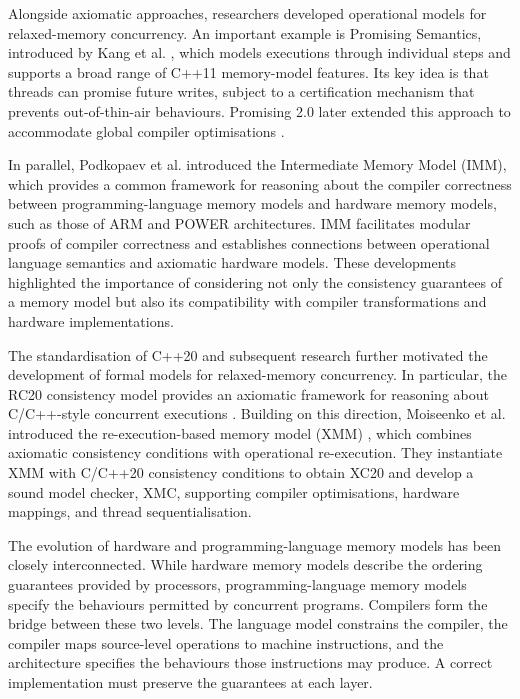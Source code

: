 Alongside axiomatic approaches, researchers developed operational models for relaxed-memory concurrency. An important example is Promising Semantics, introduced by Kang et al. \cite{Kang2017}, which models executions through individual steps and supports a broad range of C++11 memory-model features. Its key idea is that threads can promise future writes, subject to a certification mechanism that prevents out-of-thin-air behaviours. Promising 2.0 later extended this approach to accommodate global compiler optimisations \cite{Kang2020}.

In parallel, Podkopaev et al. \cite{Podkopaev2019} introduced the Intermediate Memory Model (IMM), which provides a common framework for reasoning about the compiler correctness  between programming-language memory models and hardware memory models, such as those of ARM and POWER architectures. IMM facilitates modular proofs of compiler correctness and establishes connections between operational language semantics and axiomatic hardware models. These developments highlighted the importance of considering not only the consistency guarantees of a memory model but also its compatibility with compiler transformations and hardware implementations.

The standardisation of C++20 and subsequent research further motivated the development of formal models for relaxed-memory concurrency. In particular, the RC20 consistency model provides an axiomatic framework for reasoning about C/C++-style concurrent executions \cite{MargalitLahav2021}. Building on this direction, Moiseenko et al. introduced the re-execution-based memory model (XMM) \cite{Moiseenko2025}, which combines axiomatic consistency conditions with operational re-execution. They instantiate XMM with C/C++20 consistency conditions to obtain XC20 and develop a sound model checker, XMC, supporting compiler optimisations, hardware mappings, and thread sequentialisation.

The evolution of hardware and programming-language memory models has been closely interconnected. While hardware memory models describe the ordering guarantees provided by processors, programming-language memory models specify the behaviours permitted by concurrent programs.
Compilers form the bridge between these two levels. The language model constrains the compiler, the compiler maps source-level operations to machine instructions, and the architecture specifies the behaviours those instructions may produce. A correct implementation must preserve the guarantees at each layer.

